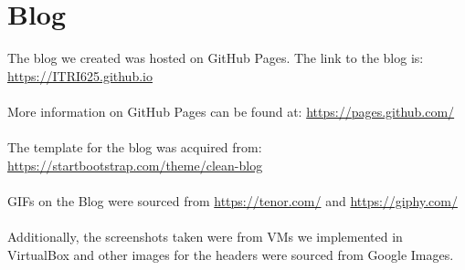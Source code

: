 \documentclass[a4paper, 12pt, titlepage]{report}
\begin{document}
\section{Blog}
The blog we created was hosted on GitHub Pages. The link to the blog is:\\
\url{https://ITRI625.github.io}\\\\
More information on GitHub Pages can be found at: \url{https://pages.github.com/}\\\\
The template for the blog was acquired from:\\
\url{https://startbootstrap.com/theme/clean-blog}\\\\
GIFs on the Blog were sourced from \url{https://tenor.com/} and \url{https://giphy.com/}\\\\
Additionally, the screenshots taken were from VMs we implemented in VirtualBox and other images for the headers were sourced from Google Images.
\end{document}
